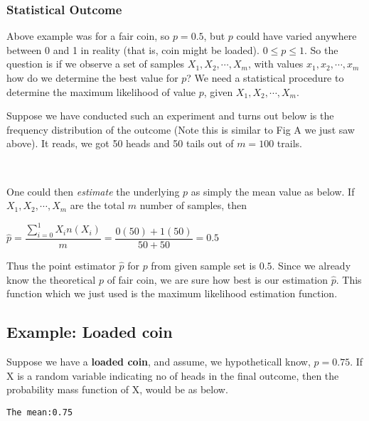 \documentclass[float=false,crop=false]{standalone}
\begin{document}
    \subsubsection{Statistical Outcome}\label{statistical-outcome}

Above example was for a fair coin, so \(p=0.5\), but \(p\) could have
varied anywhere between 0 and 1 in reality (that is, coin might be
loaded). \(0 \leq p \leq 1\). So the question is if we observe a set of
samples \(X_1, X_2, \cdots, X_m\), with values \(x_1,x_2, \cdots, x_m\)
how do we determine the best value for \(p\)? We need a statistical
procedure to determine the maximum likelihood of value \(p\), given
\(X_1, X_2, \cdots, X_m\).

Suppose we have conducted such an experiment and turns out below is the
frequency distribution of the outcome (Note this is similar to Fig A we
just saw above). It reads, we got 50 heads and 50 tails out of \(m=100\)
trails.
    \begin{center}
    \end{center}
    { \hspace*{\fill} \\}
    
    One could then \emph{estimate} the underlying \(p\) as simply the mean
value as below. If \(X_1,X_2,\cdots,X_m\) are the total \(m\) number of
samples, then

\(\hat{p} = \dfrac{\sum\limits_{i=0}^1X_in(X_i)}{m} = \dfrac{ 0(50) + 1(50)}{50 + 50} = 0.5\)

Thus the point estimator \(\hat{p}\) for \(p\) from given sample set is
\(0.5\). Since we already know the theoretical \(p\) of fair coin, we
are sure how best is our estimation \(\hat{p}\). This function which we
just used is the maximum likelihood estimation function.

    \subsection{Example: Loaded coin}\label{example-loaded-coin}

Suppose we have a \textbf{loaded coin}, and assume, we hypotheticall
know, \(p = 0.75\). If X is a random variable indicating no of heads in
the final outcome, then the probability mass function of X, would be as
below.
    \begin{Verbatim}[commandchars=\\\{\},fontsize=\footnotesize]
The mean:0.75

    \end{Verbatim}
\end{document}

